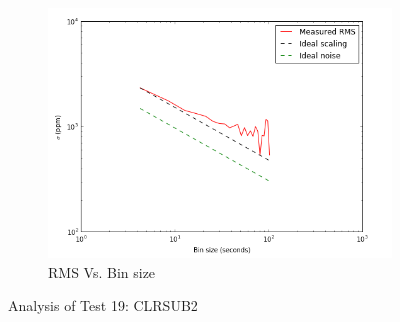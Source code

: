 \documentclass[conference]{IEEEtran}
\begin{document}
\begin{figure}[H]
    \begin{subfigure}{3}
        \includegraphics[scale=0.6]{rms_test19}
        \caption{RMS Vs. Bin size}
    \end{subfigure}
    \caption{Analysis of Test 19: CLRSUB2}
\end{figure}
\end{document}
